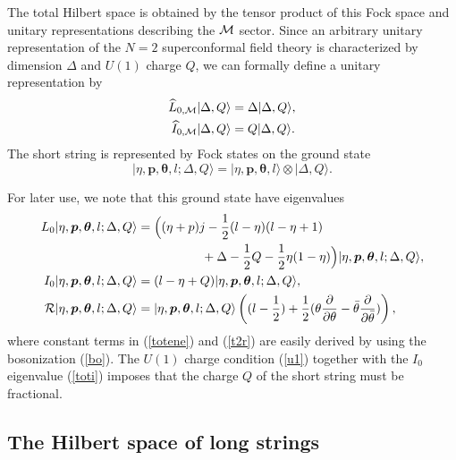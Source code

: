 \documentclass[a4paper,seceq,preprint]{ptptex}
\begin{document}
The total Hilbert space is obtained by the tensor product of 
this Fock space and unitary representations 
describing the ${\cal M}$ sector. Since an arbitrary
unitary representation of the $N=2$ superconformal field theory is 
characterized by dimension $\Delta$ and $U(1)$ charge $Q$, 
we can formally define a unitary representation by
 \begin{align}
  \widehat L_{0,{\cal M}}|\Delta,Q\rangle&=
\Delta|\Delta,Q\rangle,\nonumber\\
  \widehat I_{0,{\cal M}}|\Delta,Q\rangle&=
Q|\Delta,Q\rangle.
 \end{align}
The short string is represented by
Fock states on the ground state
\begin{equation}
 |\eta,\boldsymbol p,\boldsymbol\theta,l;\Delta,Q\rangle=
|\eta,\boldsymbol p,\boldsymbol\theta,l\rangle\otimes
|\Delta,Q\rangle.\label{shortground}
\end{equation}

For later use, we note that this ground state have
eigenvalues
 \begin{align}
  L_0|\eta,\boldsymbol p,\boldsymbol\theta,l;\Delta,Q\rangle&=
\Big((\eta+p)j-\frac{1}{2}(l-\eta)(l-\eta+1)\nonumber\\
&\hspace{1.8cm}
+\Delta-\frac{1}{2}Q-\frac{1}{2}\eta(1-\eta)\Big)
|\eta,\boldsymbol p,\boldsymbol\theta,l;\Delta,Q\rangle,
\label{totene}\\
  I_0|\eta,\boldsymbol p,\boldsymbol\theta,l;\Delta,Q\rangle&=
(l-\eta+Q)|\eta,\boldsymbol p,\boldsymbol\theta,l;\Delta,Q\rangle,
\label{toti}\\
 {\cal R}|\eta,\boldsymbol p,\boldsymbol\theta,l;\Delta,Q\rangle
&=|\eta,\boldsymbol p,\boldsymbol\theta,l;\Delta,Q\rangle\left(
(l-\frac{1}{2})+\frac{1}{2}(\theta\frac{\partial}{\partial\theta}
-\bar\theta\frac{\partial}{\partial\bar\theta})\right),\label{t2r}
 \end{align}
where constant terms in (\ref{totene}) and (\ref{t2r})
are easily derived by using the bosonization (\ref{bo}).
The $U(1)$ charge condition (\ref{u1}) together with 
the $I_0$ eigenvalue (\ref{toti}) imposes that the charge $Q$ 
of the short string must be fractional.

\subsection{The Hilbert space of long strings}\label{long}
\end{document}

